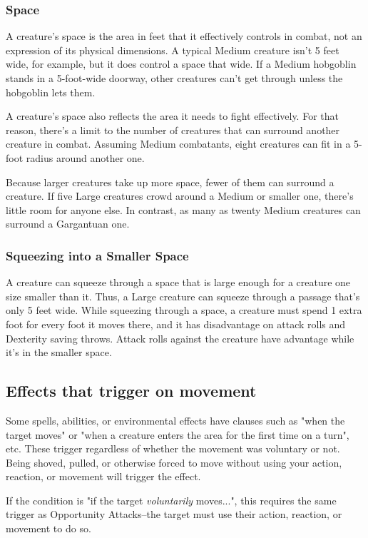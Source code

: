 \subsubsection{Space}

A creature's space is the area in feet that it effectively controls in combat, not an expression of its physical dimensions. A typical Medium creature isn't 5 feet wide, for example, but it does control a space that wide. If a Medium hobgoblin stands in a 5-foot-wide doorway, other creatures can't get through unless the hobgoblin lets them.

A creature's space also reflects the area it needs to fight effectively. For that reason, there's a limit to the number of creatures that can surround another creature in combat. Assuming Medium combatants, eight creatures can fit in a 5-foot radius around another one.

Because larger creatures take up more space, fewer of them can surround a creature. If five Large creatures crowd around a Medium or smaller one, there's little room for anyone else. In contrast, as many as twenty Medium creatures can surround a Gargantuan one.

\subsubsection{Squeezing into a Smaller Space}

A creature can squeeze through a space that is large enough for a creature one size smaller than it. Thus, a Large creature can squeeze through a passage that's only 5 feet wide. While squeezing through a space, a creature must spend 1 extra foot for every foot it moves there, and it has disadvantage on attack rolls and Dexterity saving throws. Attack rolls against the creature have advantage while it's in the smaller space.

\subsection{Effects that trigger on movement}
Some spells, abilities, or environmental effects have clauses such as "when the target moves" or "when a creature enters the area for the first time on a turn", etc. These trigger regardless of whether the movement was voluntary or not. Being shoved, pulled, or otherwise forced to move without using your action, reaction, or movement will trigger the effect.

If the condition is "if the target \textit{voluntarily} moves...", this requires the same trigger as Opportunity Attacks--the target must use their action, reaction, or movement to do so.

